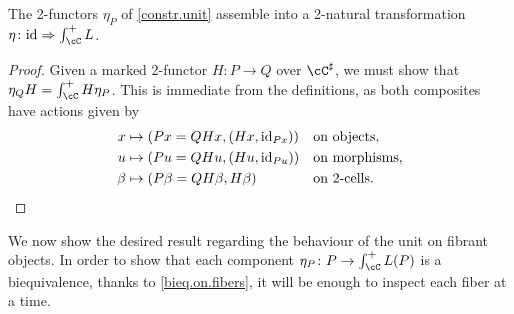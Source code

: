 \documentclass[11pt, dvipsnames]{amsart}
\begin{document}
\begin{lem}\label{eta.is.natural}
    The 2-functors $\eta_P$ of \cref{constr.unit} assemble into a 2-natural transformation $\eta\colon \id\Rightarrow\int_\cC^+ L$.
\end{lem}
\begin{proof}
    Given a marked 2-functor $H\colon P\to Q$ over $\Csharp$, we must show that $\eta_Q H=\int_\cC^+ H \eta_P$. This is immediate from the definitions, as both composites have actions given by
      \[
		\begin{aligned}
		x &\mapsto (Px=QHx, (Hx,\mathrm{id}_{Px})) && \text{on objects,}\\
		u &\mapsto (Pu=QHu, (Hu,\mathrm{id}_{Pu})) && \text{on morphisms,}\\
		\beta &\mapsto (P\beta=QH\beta, H\beta) && \text{on $2$-cells.}
		\end{aligned}
	\]
\end{proof}

We now show the desired result regarding the behaviour of the unit on fibrant objects. In order to show that each component $\eta_P\colon P\to \int_\cC^+ L(P)$ is a biequivalence, thanks to \cref{bieq.on.fibers}, it will be enough to inspect each fiber at a time.
\end{document}
